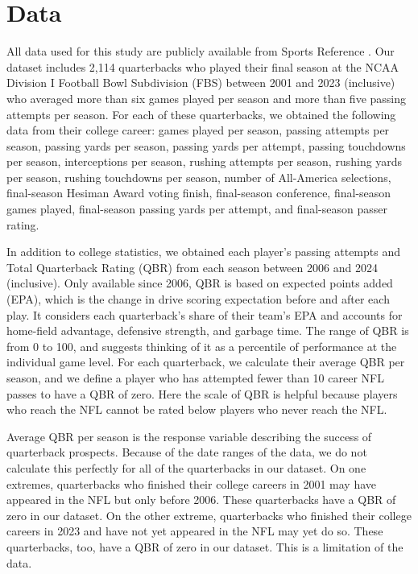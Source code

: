 \documentclass{article}
\begin{document}
\section{Data}
\label{sec:data}

All data used for this study are publicly available from Sports Reference \citep{sports_reference_sports_2025}. Our dataset includes 2,114 quarterbacks who played their final season at the NCAA Division I Football Bowl Subdivision (FBS) between 2001 and 2023 (inclusive) who averaged more than six games played per season and more than five passing attempts per season. For each of these quarterbacks, we obtained the following data from their college career: games played per season, passing attempts per season, passing yards per season, passing yards per attempt, passing touchdowns per season, interceptions per season, rushing attempts per season, rushing yards per season, rushing touchdowns per season, number of All-America selections, final-season Hesiman Award voting finish, final-season conference, final-season games played, final-season passing yards per attempt, and final-season passer rating.

In addition to college statistics, we obtained each player's passing attempts and Total Quarterback Rating (QBR) \citep{burke_how_2016} from each season between 2006 and 2024 (inclusive). Only available since 2006, QBR is based on expected points added (EPA), which is the change in drive scoring expectation before and after each play. It considers each quarterback's share of their team's EPA and accounts for home-field advantage, defensive strength, and garbage time. The range of QBR is from 0 to 100, and \citet{burke_how_2016} suggests thinking of it as a percentile of performance at the individual game level. For each quarterback, we calculate their average QBR per season, and we define a player who has attempted fewer than 10 career NFL passes to have a QBR of zero. Here the scale of QBR is helpful because players who reach the NFL cannot be rated below players who never reach the NFL.

Average QBR per season is the response variable describing the success of quarterback prospects. Because of the date ranges of the data, we do not calculate this perfectly for all of the quarterbacks in our dataset. On one extremes, quarterbacks who finished their college careers in 2001 may have appeared in the NFL but only before 2006. These quarterbacks have a QBR of zero in our dataset. On the other extreme, quarterbacks who finished their college careers in 2023 and have not yet appeared in the NFL may yet do so. These quarterbacks, too, have a QBR of zero in our dataset. This is a limitation of the data.
\end{document}

